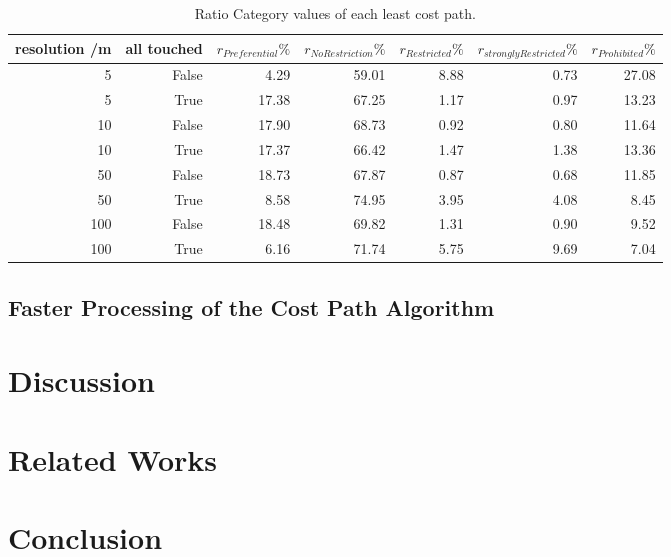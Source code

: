 \documentclass[acmtog]{acmart}
\begin{document}
	\begin{table}[h!]
		\caption{Ratio Category values of each least cost path.}
		\label{table:3}
		\centering
		\begin{tabular}{ r  r  r  r  r  r  r }
			resolution /m & all touched & $ r_{Preferential} \% $  & $ r_{No Restriction} \% $ & $ r_{Restricted} \% $ & $ r_{strongly Restricted}\% $ & $ r_{Prohibited} \% $ \\
			\hline
			5 & False &  4.29 & 59.01  & 8.88 & 0.73 & 27.08  \\
			5 & True &  17.38 & 67.25  & 1.17 & 0.97 & 13.23\\
			
			10 & False &  17.90 & 68.73  & 0.92 & 0.80 & 11.64\\
			10 & True &  17.37 & 66.42  & 1.47 & 1.38 & 13.36\\
			
			50 & False &  18.73 & 67.87  & 0.87 & 0.68 & 11.85\\
			50 & True &  8.58 & 74.95  & 3.95 & 4.08 & 8.45\\
			
			100 & False &  18.48 & 69.82  & 1.31 & 0.90 & 9.52\\
			100 & True &  6.16 & 71.74  & 5.75 & 9.69 & 7.04\\			

		\end{tabular}
	\end{table}
	\subsection{Faster Processing of the Cost Path Algorithm}
	
	
	\section{Discussion}
	\section{Related Works}
	\section{Conclusion}


	

	
\end{document}
